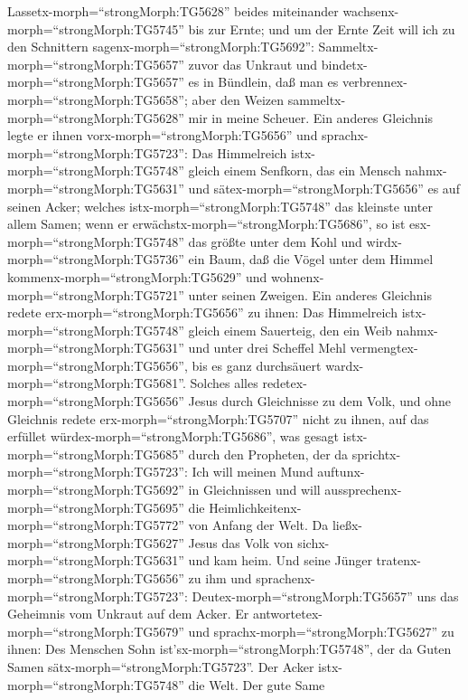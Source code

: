 Lassetx-morph=``strongMorph:TG5628'' beides miteinander
wachsenx-morph=``strongMorph:TG5745'' bis zur Ernte; und um der Ernte
Zeit will ich zu den Schnittern sagenx-morph=``strongMorph:TG5692'':
Sammeltx-morph=``strongMorph:TG5657'' zuvor das Unkraut und
bindetx-morph=``strongMorph:TG5657'' es in Bündlein, daß man es
verbrennex-morph=``strongMorph:TG5658''; aber den Weizen
sammeltx-morph=``strongMorph:TG5628'' mir in meine Scheuer.
 Ein anderes Gleichnis legte er ihnen
vorx-morph=``strongMorph:TG5656'' und
sprachx-morph=``strongMorph:TG5723'': Das Himmelreich
istx-morph=``strongMorph:TG5748'' gleich einem Senfkorn, das ein Mensch
nahmx-morph=``strongMorph:TG5631'' und
sätex-morph=``strongMorph:TG5656'' es auf seinen Acker; 
welches istx-morph=``strongMorph:TG5748'' das kleinste unter allem
Samen; wenn er erwächstx-morph=``strongMorph:TG5686'', so ist
esx-morph=``strongMorph:TG5748'' das größte unter dem Kohl und
wirdx-morph=``strongMorph:TG5736'' ein Baum, daß die Vögel unter dem
Himmel kommenx-morph=``strongMorph:TG5629'' und
wohnenx-morph=``strongMorph:TG5721'' unter seinen Zweigen. 
Ein anderes Gleichnis redete erx-morph=``strongMorph:TG5656'' zu ihnen:
Das Himmelreich istx-morph=``strongMorph:TG5748'' gleich einem
Sauerteig, den ein Weib nahmx-morph=``strongMorph:TG5631'' und unter
drei Scheffel Mehl vermengtex-morph=``strongMorph:TG5656'', bis es ganz
durchsäuert wardx-morph=``strongMorph:TG5681''.  Solches
alles redetex-morph=``strongMorph:TG5656'' Jesus durch Gleichnisse zu
dem Volk, und ohne Gleichnis redete erx-morph=``strongMorph:TG5707''
nicht zu ihnen,  auf das erfüllet
würdex-morph=``strongMorph:TG5686'', was gesagt
istx-morph=``strongMorph:TG5685'' durch den Propheten, der da
sprichtx-morph=``strongMorph:TG5723'': Ich will meinen Mund
auftunx-morph=``strongMorph:TG5692'' in Gleichnissen und will
aussprechenx-morph=``strongMorph:TG5695'' die
Heimlichkeitenx-morph=``strongMorph:TG5772'' von Anfang der Welt.
 Da ließx-morph=``strongMorph:TG5627'' Jesus das Volk von
sichx-morph=``strongMorph:TG5631'' und kam heim. Und seine Jünger
tratenx-morph=``strongMorph:TG5656'' zu ihm und
sprachenx-morph=``strongMorph:TG5723'':
Deutex-morph=``strongMorph:TG5657'' uns das Geheimnis vom Unkraut auf
dem Acker.  Er antwortetex-morph=``strongMorph:TG5679'' und
sprachx-morph=``strongMorph:TG5627'' zu ihnen: Des Menschen Sohn
ist'sx-morph=``strongMorph:TG5748'', der da Guten Samen
sätx-morph=``strongMorph:TG5723''.  Der Acker
istx-morph=``strongMorph:TG5748'' die Welt. Der gute Same
